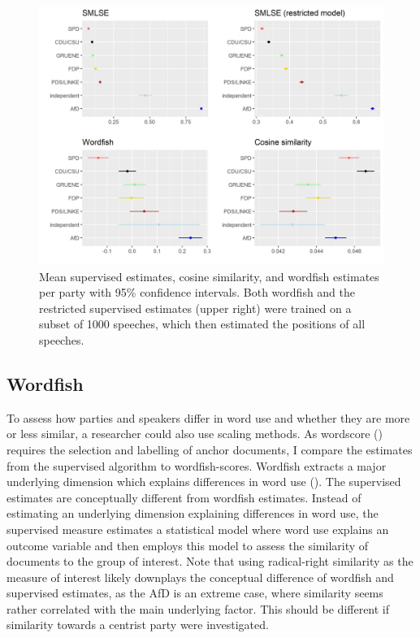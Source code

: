 \documentclass{article}
\begin{document}
\begin{figure}
    \centering
    \includegraphics[width = \textwidth]{DE/vis/similarity_pts.jpg}
    \caption{Mean supervised estimates, cosine similarity, and wordfish estimates per party with 95\% confidence intervals. Both wordfish and the restricted supervised estimates (upper right) were trained on a subset of 1000 speeches, which then estimated the positions of all speeches.}
    \label{fig:comp}
\end{figure}

\subsection{Wordfish}

To assess how parties and speakers differ in word use and whether they are more or less similar, a researcher could also use scaling methods. As wordscore (\cite{Laver2003}) requires the selection and labelling of anchor documents, I compare the estimates from the supervised algorithm to wordfish-scores. Wordfish extracts a major underlying dimension which explains differences in word use (\cite{Slapin2008}). The supervised estimates are conceptually different from wordfish estimates. Instead of estimating an underlying dimension explaining differences in word use, the supervised measure estimates a statistical model where word use explains an outcome variable and then employs this model to assess the similarity of documents to the group of interest. Note that using radical-right similarity as the measure of interest likely downplays the conceptual difference of wordfish and supervised estimates, as the AfD is an extreme case, where similarity seems rather correlated with the main underlying factor. This should be different if similarity towards a centrist party were investigated.\par
\end{document}
